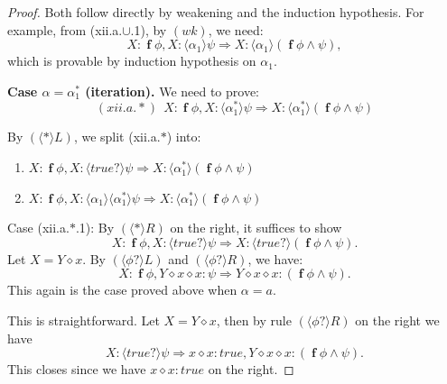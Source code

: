 \documentclass[manuscript,screen]{acmart}
\newcommand{\la}[0]{\langle}
\newcommand{\ra}[0]{\rangle}
\newcommand{\true}[0]{\mathit{true}}
\DeclareMathOperator{\seq}{;}
\DeclareMathOperator{\cho}{\cup}
\newcommand{\lup}[0]{*}
\newcommand{\cat}[0]{\diamond}
\DeclareMathOperator{\ofst}{\mathbf{f}}
\begin{document}
\begin{proof}
Both follow directly by weakening and the induction hypothesis. 
For example, from (xii.a.$\cup$.1), by $(wk)$, we need:
$$
X : \ofst \phi, X : \la\alpha_1\ra\psi \Rightarrow X : \la\alpha_1\ra(\ofst\phi\wedge\psi), 
$$
which is provable by induction hypothesis on $\alpha_1$. 

\textbf{Case $\alpha = \alpha_1^*$ (iteration).} 
We need to prove:
$$
(xii.a.*)\ \ X : \ofst\phi, X : \la\alpha_1^*\ra\psi\Rightarrow X : \la\alpha_1^*\ra(\ofst\phi\wedge\psi)
$$

By $(\la\lup\ra L)$, %
we split (xii.a.$*$) into:
\begin{enumerate}
\item[(xii.a.$*$.1)] $X : \ofst\phi, X : \la\true?\ra\psi\Rightarrow X:\la\alpha^*_1\ra(\ofst\phi\wedge \psi)$
\item[(xii.a.$*$.2)] $X : \ofst\phi, X : \la\alpha_1\ra\la\alpha_1^*\ra\psi\Rightarrow X : \la\alpha^*_1\ra(\ofst\phi\wedge \psi)$
\end{enumerate}

Case (xii.a.$*$.1): By $(\la\lup\ra R)$ on the right, %
it suffices to show 
$$
X : \ofst\phi, X : \la\true?\ra\psi\Rightarrow X:\la\true?\ra(\ofst\phi\wedge \psi). 
$$
Let $X = Y\cat x$. By $(\la\phi?\ra L)$ and $(\la\phi?\ra R)$, we have: 
$$
X : \ofst \phi, Y\cat x\cat x : \psi\Rightarrow Y\cat x\cat x : (\ofst \phi\wedge \psi). 
$$
This again is the case proved above when $\alpha = a$. 

\ifx
This is straightforward. Let $X = Y\cat x$, then by rule $(\la\phi?\ra R)$ on the right we have 
$$
X : \la\true?\ra\psi\Rightarrow x \cat x : \true, Y\cat x\cat x:(\ofst\phi\wedge \psi). 
$$
This closes since we have $x\cat x : \true$ on the right. 
\fi


\end{proof}
\end{document}
